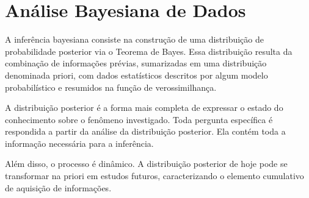 \section{Análise Bayesiana de Dados}

A inferência bayesiana consiste na construção de uma distribuição de probabilidade posterior via o Teorema de Bayes. Essa distribuição resulta da combinação de informações prévias, sumarizadas em uma distribuição denominada priori, com dados estatísticos descritos por algum modelo probabilístico e resumidos na função de verossimilhança.

A distribuição posterior é a forma mais completa de expressar o estado do conhecimento sobre o fenômeno investigado. Toda pergunta específica é respondida a partir da análise da distribuição posterior. Ela contém toda a informação necessária para a inferência.

Além disso, o processo é dinâmico. A distribuição posterior de hoje pode se transformar na priori em estudos futuros, caracterizando o elemento cumulativo de aquisição de informações.

